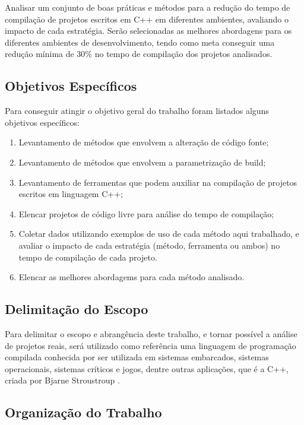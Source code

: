 Analisar um conjunto de boas práticas e métodos para a redução do
 tempo de compilação de projetos escritos em C++ em diferentes ambientes,
 avaliando o impacto de cada estratégia.
 Serão selecionadas as melhores abordagens
 para os diferentes ambientes de desenvolvimento, tendo como meta conseguir uma
 redução mínima de 30\% no tempo de compilação dos projetos analisados. 

\subsection*{Objetivos Específicos}

Para conseguir atingir o objetivo geral do trabalho foram listados
 alguns objetivos específicos:

\begin{enumerate}
	\item Levantamento de métodos que envolvem a alteração de código fonte;
	\item Levantamento de métodos que envolvem a parametrização de build;
    \item Levantamento de ferramentas que podem auxiliar na compilação
 de projetos escritos em linguagem C++;
    \item Elencar projetos de código livre para análise do tempo de
 compilação;
    \item Coletar dados utilizando exemplos de uso de cada método aqui trabalhado,
 e avaliar o impacto de cada estratégia (método, ferramenta ou ambos)
 no tempo de compilação de cada projeto.
    \item Elencar as melhores abordagems para cada método analisado.
\end{enumerate}


\subsection*{Delimitação do Escopo}

Para delimitar o escopo e abrangência deste trabalho, e tornar possível
 a análise de projetos reais, será utilizado como referência uma linguagem
 de programação compilada conhecida por ser utilizada em sistemas embarcados,
 sistemas operacionais, sistemas críticos e jogos, dentre outras aplicações,
 que é a C++, criada por Bjarne Stroustroup \cite{BjarneC++}.

\subsection*{Organização do Trabalho}

